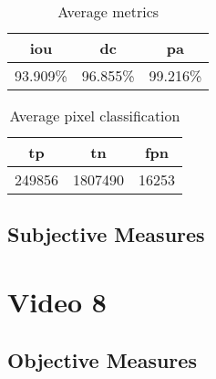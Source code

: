 \begin{minipage}[c]{0.475\textwidth}
\begin{table}[H]
    \centering
    \begin{tabular}{||c c c||} 
        \hline
        \acrshort{iou} & \acrshort{dc} & \acrshort{pa} \\ [0.5ex] 
        \hline\hline
        93.909\% & 96.855\% & 99.216\% \\ [1ex] 
        \hline
    \end{tabular}
    \caption{Average metrics}
    \label{tab:metrics_video_7}
\end{table}
\end{minipage}
\begin{minipage}[c]{0.475\textwidth}
\begin{table}[H]
    \centering
    \begin{tabular}{||c c c||} 
        \hline
        \acrshort{tp} & \acrshort{tn} & \acrshort{fpn} \\ [0.5ex] 
        \hline\hline
        249856 & 1807490 & 16253 \\ [1ex] 
        \hline
    \end{tabular}
    \caption{Average pixel classification}
    \label{tab:pixels_video_7}
\end{table}
\end{minipage}

\subsection{Subjective Measures}


\section{Video 8}
\subsection{Objective Measures}

